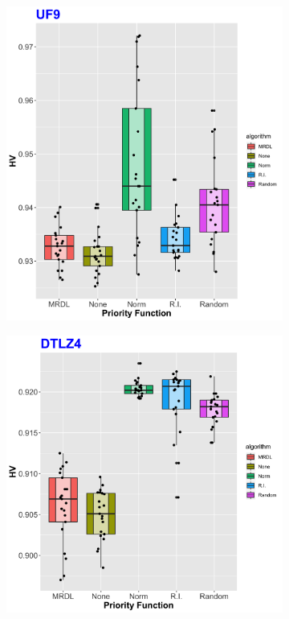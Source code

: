 \begin{figure}[!t]
	\begin{subfigure}[b]{0.33\textwidth}
		\centering
	\includegraphics[width=1\textwidth, height=0.8\textwidth]{images/UF9_HV.png}
	\end{subfigure}
	\begin{subfigure}[b]{0.33\textwidth}
		\centering
	\includegraphics[width=1\textwidth, height=0.8\textwidth]{images/DTLZ4_HV.png}
	\end{subfigure}

\end{figure}

